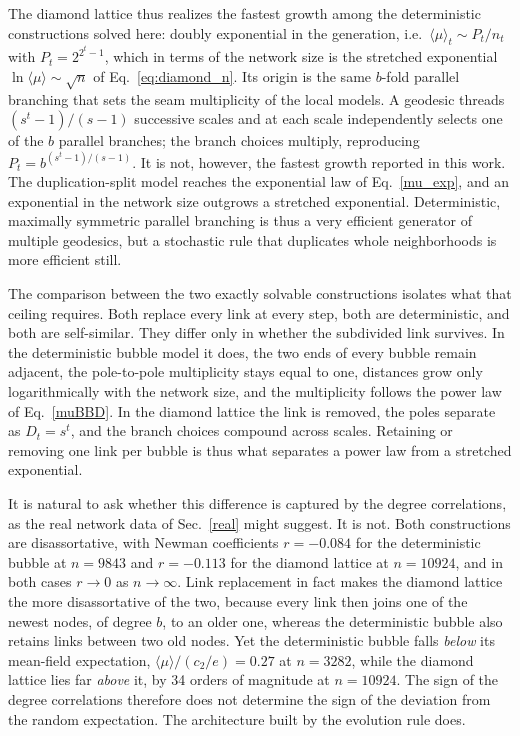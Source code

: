 \documentclass[reprint,aps,pre,amsmath,amssymb,superscriptaddress,showpacs]{revtex4-1}
\begin{document}
The diamond lattice thus realizes the fastest growth among the deterministic constructions solved here: doubly exponential in the generation, i.e.\ $\langle\mu\rangle_t\sim P_t/n_t$ with $P_t=2^{2^t-1}$, which in terms of the network size is the stretched exponential $\ln\langle\mu\rangle\sim\sqrt{n}$ of Eq.~\eqref{eq:diamond_n}. Its origin is the same $b$-fold parallel branching that sets the seam multiplicity of the local models. A geodesic threads $(s^{t}-1)/(s-1)$ successive scales and at each scale independently selects one of the $b$ parallel branches; the branch choices multiply, reproducing $P_t=b^{(s^{t}-1)/(s-1)}$. It is not, however, the fastest growth reported in this work. The duplication-split model reaches the exponential law of Eq.~\eqref{mu_exp}, and an exponential in the network size outgrows a stretched exponential. Deterministic, maximally symmetric parallel branching is thus a very efficient generator of multiple geodesics, but a stochastic rule that duplicates whole neighborhoods is more efficient still.

The comparison between the two exactly solvable constructions isolates what that ceiling requires. Both replace every link at every step, both are deterministic, and both are self-similar. They differ only in whether the subdivided link survives. In the deterministic bubble model it does, the two ends of every bubble remain adjacent, the pole-to-pole multiplicity stays equal to one, distances grow only logarithmically with the network size, and the multiplicity follows the power law of Eq.~\eqref{muBBD}. In the diamond lattice the link is removed, the poles separate as $D_t=s^t$, and the branch choices compound across scales. Retaining or removing one link per bubble is thus what separates a power law from a stretched exponential.

It is natural to ask whether this difference is captured by the degree correlations, as the real network data of Sec.~\ref{real} might suggest. It is not. Both constructions are disassortative, with Newman coefficients \cite{newman02a} $r=-0.084$ for the deterministic bubble at $n=9843$ and $r=-0.113$ for the diamond lattice at $n=10924$, and in both cases $r\rightarrow0$ as $n\rightarrow\infty$. Link replacement in fact makes the diamond lattice the more disassortative of the two, because every link then joins one of the newest nodes, of degree $b$, to an older one, whereas the deterministic bubble also retains links between two old nodes. Yet the deterministic bubble falls {\em below} its mean-field expectation, $\langle\mu\rangle/(c_2/e) = 0.27$ at $n=3282$, while the diamond lattice lies far {\em above} it, by 34 orders of magnitude at $n=10924$. The sign of the degree correlations therefore does not determine the sign of the deviation from the random expectation. The architecture built by the evolution rule does.
\end{document}
